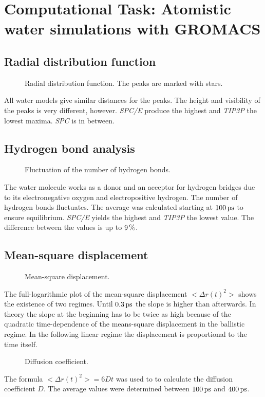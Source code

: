 \documentclass[12pt,a4paper]{scrartcl}
\begin{document}
\section{Computational Task: Atomistic water simulations with GROMACS}

\subsection{Radial distribution function}
\begin{figure}[H]
	\resizebox{\linewidth}{!}{}
    \caption{Radial distribution function. The peaks are marked with stars.} \label{fig:rdf}
\end{figure}

All water models give similar distances for the peaks. The height and visibility of the peaks is very different, however. \textit{SPC/E} produce the highest and \textit{TIP3P} the lowest maxima. \textit{SPC} is in between. 

\subsection{Hydrogen bond analysis}
\begin{figure}[H]
	\resizebox{\linewidth}{!}{}
    \caption{Fluctuation of the number of hydrogen bonds.} \label{fig:hbnum}
\end{figure}

The water molecule works as a donor and an acceptor for hydrogen bridges due to its electronegative oxygen and electropositive hydrogen. The number of hydrogen bonds fluctuates. The average was calculated starting at $\unit[100]{ps}$ to ensure equilibrium. \textit{SPC/E} yields the highest and \textit{TIP3P} the lowest value. The difference between the values is up to $\unit[9]{\%}$.

\subsection{Mean-square displacement}
\begin{figure}[H]
	\resizebox{\linewidth}{!}{}
    \caption{Mean-square displacement.} \label{fig:msd}
\end{figure}

The full-logarithmic plot of the mean-square displacement $< \Delta r(t)^2 >$ shows the existence of two regimes. Until $\unit[0.3]{ps}$ the slope is higher than afterwards. In theory the slope at the beginning has to be twice as high because of the quadratic time-dependence of the means-square displacement in the ballistic regime. In the following linear regime the displacement is proportional to the time itself.

\begin{figure}[H]
	\resizebox{\linewidth}{!}{}
    \caption{Diffusion coefficient.} \label{fig:diffusion}
\end{figure}

The formula $< \Delta r(t)^2 > = 6 D t$ was used to to calculate the diffusion coefficient $D$. The average values were determined between $\unit[100]{ps}$ and $\unit[400]{ps}$.
\end{document}
